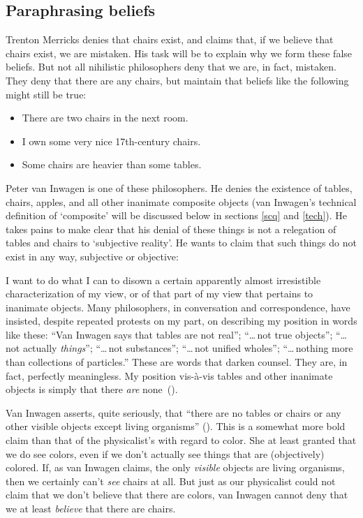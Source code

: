 \documentclass[11pt]{article}
\newenvironment{squote}{%
	\begin{spacing}{1}
	\begin{list}{}{%
	\setlength{\labelwidth}{0pt}%
	\rightmargin\leftmargin%
	}
	\item\relax
	}{%
	\end{list}%
	\end{spacing}
	}
\begin{document}
\begin{spacing}{1.5}
\subsection{Paraphrasing beliefs}
\label{paraphrase}
Trenton Merricks denies that chairs exist, and claims that, if we
believe that chairs exist, we are mistaken.  His task will be to
explain why we form these false beliefs.  But not all nihilistic
philosophers deny that we are, in fact, mistaken.  They deny that
there are any chairs, but maintain that beliefs like the following
might still be true:

\begin{itemize}
  \item There are two chairs in the next room.
  \item I own some very nice 17th-century chairs.
  \item Some chairs are heavier than some tables.
\end{itemize}

Peter van Inwagen is one of these philosophers.  He denies the
existence of tables, chairs, apples, and all other inanimate composite
objects (van Inwagen's technical definition of `composite' will be
discussed below in sections \ref{scq} and \ref{tech}).  He takes pains
to make clear that his denial of these things is not a relegation of
tables and chairs to `subjective reality'.  He wants to claim that
such things do not exist in any way, subjective or objective:
\begin{squote}
I want to do what I can to disown a certain apparently almost
irresistible characterization of my view, or of that part of my view
that pertains to inanimate objects.  Many philosophers, in
conversation and correspondence, have insisted, despite repeated
protests on my part, on describing my position in words like these:
``Van Inwagen says that tables are not real''; ``\ldots\,not true
objects''; ``\ldots\,not actually {\em things}''; ``\ldots\,not
substances''; ``\ldots\,not unified wholes''; ``\ldots\,nothing more
than collections of particles.''  These are words that darken counsel.
They are, in fact, perfectly meaningless.  My position vis-\`{a}-vis
tables and other inanimate objects is simply that there {\em are}
none~(\citeyear[99]{inwagen1995}).
\end{squote}

Van Inwagen asserts, quite seriously, that ``there are no tables or
chairs or any other visible objects except living organisms''
(\citeyear[1]{inwagen1995}).  This is a somewhat more bold claim than
that of the physicalist's with regard to color.  She at least granted
that we do see colors, even if we don't actually see things that are
(objectively) colored.  If, as van Inwagen claims, the only {\em
  visible} objects are living organisms, then we certainly can't {\em
  see} chairs at all.  But just as our physicalist could not claim
that we don't believe that there are colors, van Inwagen cannot deny
that we at least {\em believe} that there are chairs.


\end{spacing}
\end{document}

